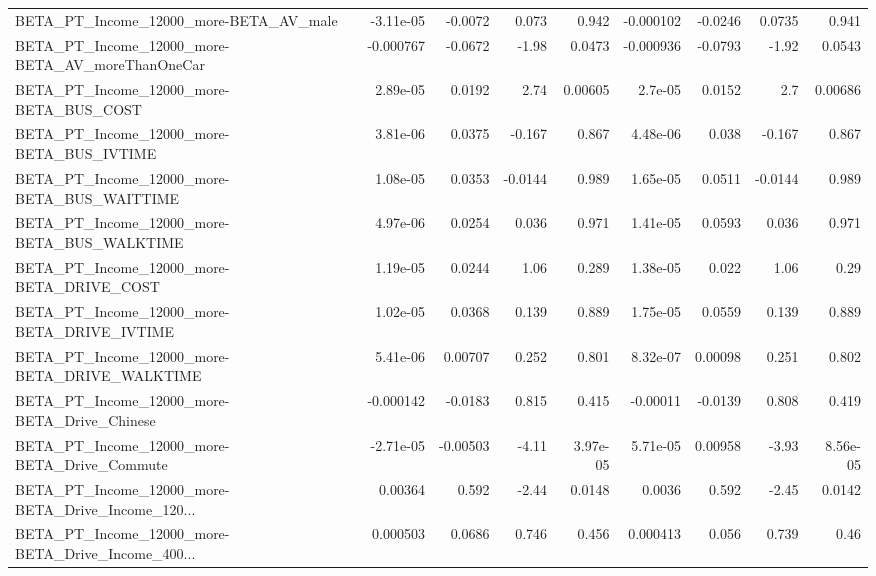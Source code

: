 \begin{tabular}{lrrrrrrrr}
BETA\_PT\_Income\_12000\_more-BETA\_AV\_male             &   -3.11e-05 &      -0.0072 &     0.073 &    0.942 &  -0.000102 &     -0.0246 &       0.0735 &         0.941 \\
BETA\_PT\_Income\_12000\_more-BETA\_AV\_moreThanOneCar   &   -0.000767 &      -0.0672 &     -1.98 &   0.0473 &  -0.000936 &     -0.0793 &        -1.92 &        0.0543 \\
BETA\_PT\_Income\_12000\_more-BETA\_BUS\_COST            &    2.89e-05 &       0.0192 &      2.74 &  0.00605 &    2.7e-05 &      0.0152 &          2.7 &       0.00686 \\
BETA\_PT\_Income\_12000\_more-BETA\_BUS\_IVTIME          &    3.81e-06 &       0.0375 &    -0.167 &    0.867 &   4.48e-06 &       0.038 &       -0.167 &         0.867 \\
BETA\_PT\_Income\_12000\_more-BETA\_BUS\_WAITTIME        &    1.08e-05 &       0.0353 &   -0.0144 &    0.989 &   1.65e-05 &      0.0511 &      -0.0144 &         0.989 \\
BETA\_PT\_Income\_12000\_more-BETA\_BUS\_WALKTIME        &    4.97e-06 &       0.0254 &     0.036 &    0.971 &   1.41e-05 &      0.0593 &        0.036 &         0.971 \\
BETA\_PT\_Income\_12000\_more-BETA\_DRIVE\_COST          &    1.19e-05 &       0.0244 &      1.06 &    0.289 &   1.38e-05 &       0.022 &         1.06 &          0.29 \\
BETA\_PT\_Income\_12000\_more-BETA\_DRIVE\_IVTIME        &    1.02e-05 &       0.0368 &     0.139 &    0.889 &   1.75e-05 &      0.0559 &        0.139 &         0.889 \\
BETA\_PT\_Income\_12000\_more-BETA\_DRIVE\_WALKTIME      &    5.41e-06 &      0.00707 &     0.252 &    0.801 &   8.32e-07 &     0.00098 &        0.251 &         0.802 \\
BETA\_PT\_Income\_12000\_more-BETA\_Drive\_Chinese       &   -0.000142 &      -0.0183 &     0.815 &    0.415 &   -0.00011 &     -0.0139 &        0.808 &         0.419 \\
BETA\_PT\_Income\_12000\_more-BETA\_Drive\_Commute       &   -2.71e-05 &     -0.00503 &     -4.11 & 3.97e-05 &   5.71e-05 &     0.00958 &        -3.93 &      8.56e-05 \\
BETA\_PT\_Income\_12000\_more-BETA\_Drive\_Income\_120... &     0.00364 &        0.592 &     -2.44 &   0.0148 &     0.0036 &       0.592 &        -2.45 &        0.0142 \\
BETA\_PT\_Income\_12000\_more-BETA\_Drive\_Income\_400... &    0.000503 &       0.0686 &     0.746 &    0.456 &   0.000413 &       0.056 &        0.739 &          0.46 \\

\end{tabular}
